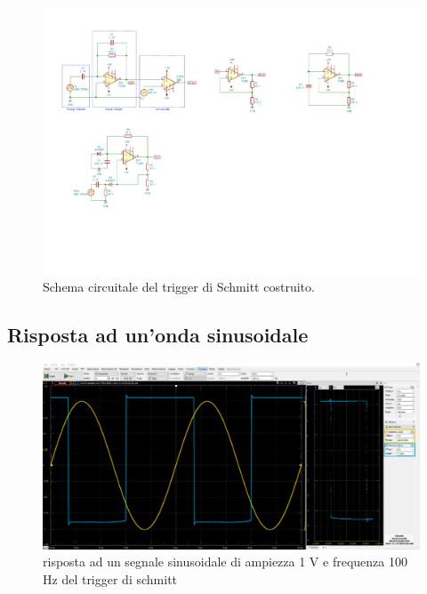 \documentclass[10pt,a4paper]{article}
\begin{document}
\begin{figure}[htbp]
    \centering
	\includegraphics[scale=1.5]{trgSchmitt}
    \caption{Schema circuitale del trigger di Schmitt costruito.
    \label{fig: trgschmittschm}}
\end{figure}

\subsection{Risposta ad un'onda sinusoidale}

\begin{figure}[htbp]
\centering
\includegraphics[scale=0.335]{schmitt}
\caption{risposta ad un segnale sinusoidale di ampiezza 1 V e frequenza 100 Hz del trigger di schmitt}
\end{figure}
\end{document}
